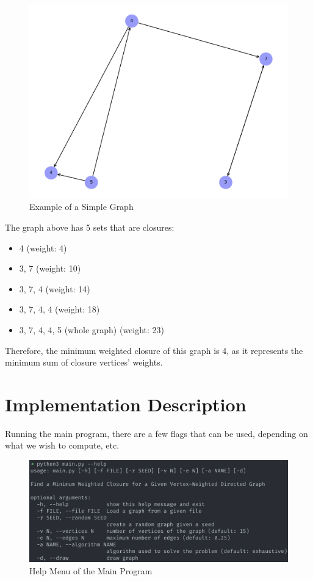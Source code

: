 \documentclass[...]{revdetua}
\begin{document}
\begin{figure}[!htb]
    \centering
    \includegraphics[width=0.75\columnwidth]{./figures/simple_graph.png}
    \caption{Example of a Simple Graph}
    \label{fig:Simple Graph}
\end{figure}

The graph above has 5 sets that are closures:

\begin{itemize}
    \item 4 (weight: 4)
    \item 3, 7 (weight: 10)
    \item 3, 7, 4 (weight: 14)
    \item 3, 7, 4, 4 (weight: 18)
    \item 3, 7, 4, 4, 5 (whole graph) (weight: 23)
\end{itemize}

Therefore, the minimum weighted closure of this graph is 4, as it represents the minimum sum of closure vertices' weights.

\section{ Implementation Description}

Running the main program, there are a few flags that can be used, depending on what we wish to compute, etc.

\begin{figure}[!htb]
    \centering
    \includegraphics[width=1\columnwidth]{./figures/program_help}
    \caption{Help Menu of the Main Program}
    \label{fig:Help Menu}
\end{figure}
\end{document}
